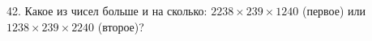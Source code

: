 42. Какое из чисел больше и на сколько: $2238\times239\times1240$ (первое) или $1238\times239\times2240$ (второе)?\\
